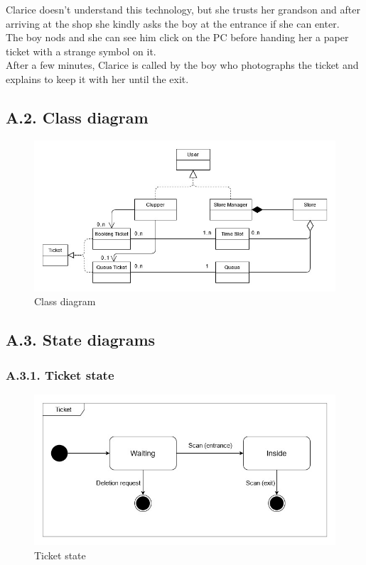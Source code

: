 Clarice doesn't understand this technology, but she trusts her grandson and after arriving at the shop she kindly asks the boy at the entrance if she can enter.\\
The boy nods and she can see him click on the PC before handing her a paper ticket with a strange symbol on it.\\
After a few minutes, Clarice is called by the boy who photographs the ticket and explains to keep it with her until the exit.

\subsection{A.2. Class diagram}

\begin{figure}
\centering
\includegraphics{class_diagram/class_diagram_rasd}
\caption{Class diagram}
\end{figure}

\subsection{A.3. State diagrams}

\subsubsection{A.3.1. Ticket state}

\begin{figure}[H]
\centering
\includegraphics{state_diagrams/ticket_state}
\caption{Ticket state}
\end{figure}

